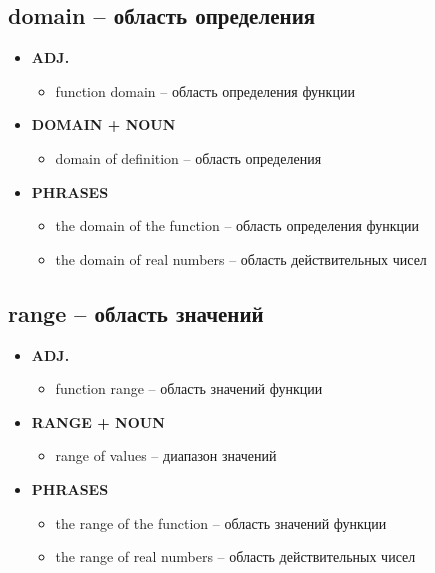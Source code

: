 \documentclass[a4paper, 10pt]{article}
\theoremstyle{definition}
\theoremstyle{plain}
\theoremstyle{remark}
\begin{document}
\subsection{domain – область определения}

\begin{itemize}
    \item \textbf{ADJ.}
    \begin{itemize}
        \item function domain – область определения функции
    \end{itemize}
    
    \item \textbf{DOMAIN + NOUN}
    \begin{itemize}
        \item domain of definition – область определения
    \end{itemize}
    
    \item \textbf{PHRASES}
    \begin{itemize}
        \item the domain of the function – область определения функции
        \item the domain of real numbers – область действительных чисел
    \end{itemize}
\end{itemize}

\subsection{range – область значений}

\begin{itemize}
    \item \textbf{ADJ.}
    \begin{itemize}
        \item function range – область значений функции
    \end{itemize}
    
    \item \textbf{RANGE + NOUN}
    \begin{itemize}
        \item range of values – диапазон значений
    \end{itemize}
    
    \item \textbf{PHRASES}
    \begin{itemize}
        \item the range of the function – область значений функции
        \item the range of real numbers – область действительных чисел
    \end{itemize}
\end{itemize}
\end{document}
